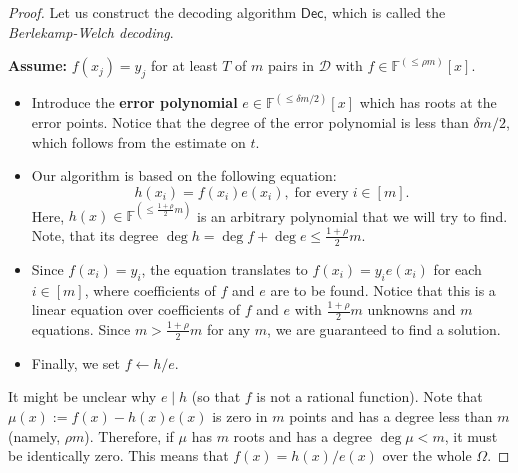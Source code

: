\documentclass[../lecture-notes-148x210.tex]{subfiles}
\begin{document}
\begin{proof} Let us construct the decoding algorithm $\mathsf{Dec}$, which is
    called the \textit{Berlekamp-Welch decoding}.

\newpage
\begin{tcolorbox}[title=Berlekamp-Welch Decoding,
    breakable,
    colback=blue!5!white,
    colframe=blue!75!black,
    colbacktitle=blue!25!white,
    coltitle=blue!20!black,
    fonttitle=\bfseries,
    boxrule=1.25pt,
    subtitle style={boxrule=0pt,
    colback=blue!20!white,
    colupper=blue!75!gray} ]

    \textbf{Assume:} $f(x_j) = y_j$ for at least $T$ of $m$ pairs in
    $\mathcal{D}$ with $f \in \mathbb{F}^{(\leq \rho m)}[x]$.


    \begin{itemize}[label=]
        \item Introduce the \textbf{error polynomial} $e \in \mathbb{F}^{(\leq
        \delta m/2)}[x]$ which has roots at the error points. Notice that the
        degree of the error polynomial is less than $\delta m/2$, which follows
        from the estimate on $t$.
        \item Our algorithm is based on the following equation: 
        \begin{equation*}
            h(x_i) = f(x_i)e(x_i), \; \text{for every} \; i \in [m].
        \end{equation*}
        Here, $h(x) \in \mathbb{F}^{\left(\leq \frac{1+\rho}{2}m\right)}$ is an
        arbitrary polynomial that we will try to find. Note, that its degree
        $\deg h = \deg f + \deg e \leq \frac{1+\rho}{2}m$.
        \item Since $f(x_i)=y_i$, the equation translates to $f(x_i)=y_ie(x_i)$
        for each $i \in [m]$, where coefficients of $f$ and $e$ are to be found.
        Notice that this is a linear equation over coefficients of $f$ and $e$
        with $\frac{1+\rho}{2}m$ unknowns and $m$ equations. Since $m>\frac{1+\rho}{2}m$
        for any $m$, we are guaranteed to find a solution.
        \item Finally, we set $f \gets h/e$.
    \end{itemize}
\end{tcolorbox}

It might be unclear why $e \mid h$ (so that $f$ is not a rational function).
Note that $\mu(x) := f(x)-h(x)e(x)$ is zero in $m$ points and has a degree less
than $m$ (namely, $\rho m$). Therefore, if $\mu$ has $m$ roots and has a degree
$\deg \mu < m$, it must be identically zero. This means that $f(x) = h(x)/e(x)$
over the whole $\Omega$.
\end{proof}
\end{document}
